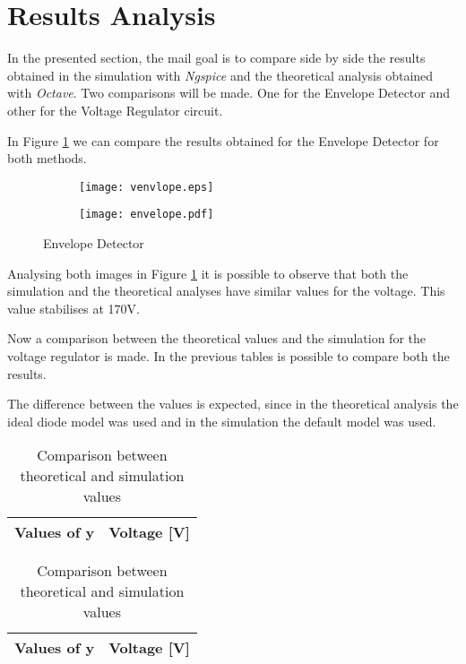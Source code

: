 \newpage

\section{Results Analysis}
\label{sec:resultsanalysis}

In the presented section, the mail goal is to compare side by side the results obtained in the simulation with \textit{Ngspice} and the theoretical analysis obtained with \textit{Octave}. Two comparisons will be made. One for the Envelope Detector and other for the Voltage Regulator circuit. 


In Figure \ref{fig:point1} we can compare the results obtained for the Envelope Detector for both methods. 

\begin{figure}[h]
\centering
  \begin{subfigure}[b]{0.4\textwidth}
  \centering
    \texttt{[image: venvlope.eps]}
  \end{subfigure}
  \hfill
  \begin{subfigure}[b]{0.4\textwidth}
  \centering
    \texttt{[image: envelope.pdf]}
  \end{subfigure}
  \caption{Envelope Detector}
  \label{fig:point1}
\end{figure}


Analysing both images in Figure \ref{fig:point1} it is possible to observe that both the simulation and the theoretical analyses have similar values for the voltage. This value stabilises at 170V.

\newpage

Now a comparison between the theoretical values and the simulation for the voltage regulator is made. In the previous tables is possible to compare both the results.

The difference between the values is expected, since in the theoretical analysis the ideal diode model was used and in the simulation the default model was used. 




\begin{table}
\begin{center}
\begin{tabular}{|c|c|}
 \hline    
    {\bf Values of y} & {\bf Voltage [V]} \\ \hline
    
\end{tabular}
\begin{tabular}{|c|c|}
\hline    
    {\bf Values of y} & {\bf Voltage [V]} \\ \hline
    
\end{tabular}
\caption{Comparison between theoretical and simulation values}
\end{center}
\end{table}



